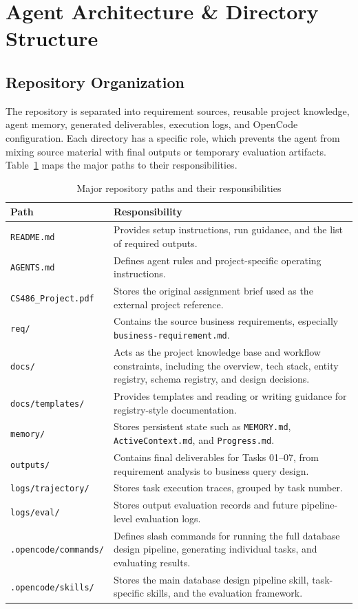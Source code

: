 \section{Agent Architecture \& Directory Structure}

\subsection{Repository Organization}
The repository is separated into requirement sources, reusable project knowledge, agent memory, generated deliverables, execution logs, and OpenCode configuration. Each directory has a specific role, which prevents the agent from mixing source material with final outputs or temporary evaluation artifacts. Table~\ref{tab:repo-structure} maps the major paths to their responsibilities.

\begin{table}[htbp]
\centering
\footnotesize
\renewcommand{\arraystretch}{1.18}
\begin{tabularx}{\textwidth}{>{\raggedright\arraybackslash}p{4.0cm} X}
\toprule
\textbf{Path} & \textbf{Responsibility} \\
\midrule
\texttt{README.md} & Provides setup instructions, run guidance, and the list of required outputs. \\
\texttt{AGENTS.md} & Defines agent rules and project-specific operating instructions. \\
\texttt{CS486\_Project.pdf} & Stores the original assignment brief used as the external project reference. \\
\texttt{req/} & Contains the source business requirements, especially \texttt{business-requirement.md}. \\
\texttt{docs/} & Acts as the project knowledge base and workflow constraints, including the overview, tech stack, entity registry, schema registry, and design decisions. \\
\texttt{docs/templates/} & Provides templates and reading or writing guidance for registry-style documentation. \\
\texttt{memory/} & Stores persistent state such as \texttt{MEMORY.md}, \texttt{ActiveContext.md}, and \texttt{Progress.md}. \\
\texttt{outputs/} & Contains final deliverables for Tasks 01--07, from requirement analysis to business query design. \\
\texttt{logs/trajectory/} & Stores task execution traces, grouped by task number. \\
\texttt{logs/eval/} & Stores output evaluation records and future pipeline-level evaluation logs. \\
\texttt{.opencode/commands/} & Defines slash commands for running the full database design pipeline, generating individual tasks, and evaluating results. \\
\texttt{.opencode/skills/} & Stores the main database design pipeline skill, task-specific skills, and the evaluation framework. \\
\bottomrule
\end{tabularx}
\caption{Major repository paths and their responsibilities}
\label{tab:repo-structure}
\end{table}



